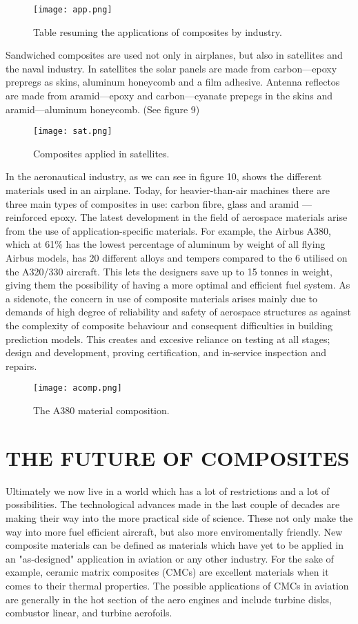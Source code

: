\documentclass[letterpaper]{article}
\begin{document}
\begin{figure}[H]
	\centering
	\texttt{[image: app.png]}
	\caption{Table resuming the applications of composites by industry.}
\end{figure}
\begin{multicols}{2}
	Sandwiched composites are used not only in airplanes, but also in satellites and the naval industry. In satellites the solar panels are made from carbon---epoxy prepregs as skins, aluminum honeycomb and a film adhesive. Antenna reflectos are made from aramid---epoxy and carbon---cyanate prepegs in the skins and aramid---aluminum honeycomb. (See figure 9)
	\begin{figure}[H]
		\centering
		\texttt{[image: sat.png]}
		\caption{Composites applied in satellites.}
	\end{figure}
	In the aeronautical industry, as we can see in figure 10, shows the different materials used in an airplane.\supercite{sohel16} Today, for heavier-than-air machines there are three main types of composites in use: carbon fibre, glass and aramid --- reinforced epoxy. The latest development in the field of aerospace materials arise from the use of application-specific materials. For example, the Airbus A380, which at 61\% has the lowest percentage of aluminum by weight of all flying Airbus models, has 20 different alloys and tempers compared to the 6 utilised on the A320/330 aircraft. This lets the designers save up to 15 tonnes in weight, giving them the possibility of having a more optimal and efficient fuel system.\supercite{mrazova13}
	As a sidenote, the concern in use of composite materials arises mainly due to demands of high degree of reliability and safety of aerospace structures as against the complexity of composite behaviour and consequent difficulties in building prediction models. This creates and excesive reliance on testing at all stages; design and development, proving certification, and in-service inspection and repairs.\supercite{nayak14}

	\begin{figure}[H]
		\centering
		\texttt{[image: acomp.png]}
		\caption{The A380 material composition.}
	\end{figure}
	\section{THE FUTURE OF COMPOSITES}
	Ultimately we now live in a world which has a lot of restrictions and a lot of possibilities. The technological advances made in the last couple of decades are making their way into the more practical side of science. These not only make the way into more fuel efficient aircraft, but also more enviromentally friendly. New composite materials can be defined as materials which have yet to be applied in an "as-designed" application in aviation or any other industry. For the sake of example, ceramic matrix composites (CMCs) are excellent materials when it comes to their thermal properties. The possible applications of CMCs in aviation are generally in the hot section of the aero engines and include turbine disks, combustor linear, and turbine aerofoils.\supercite{nayak14}


\end{multicols}
\end{document}
